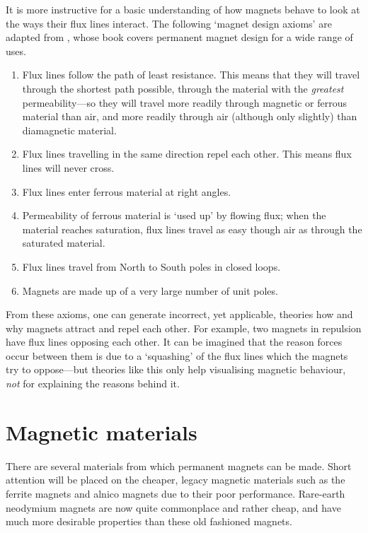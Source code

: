 It is more instructive for a basic understanding of how magnets behave
to look at the ways their flux lines interact. The following `magnet
design axioms' are adapted from \textcite{moskowitz1995}, whose book
covers permanent magnet design for a wide range of uses.

\begin{enumerate}
\item Flux lines follow the path of least resistance. This means that they will
travel through the shortest path possible, 
through the material with the
\emph{greatest} permeability---so they will travel more readily through
magnetic or ferrous material than air, and more readily through air 
(although only slightly) than diamagnetic material.

\item Flux lines travelling in the same direction repel each other. This means
flux lines will never cross.

\item Flux lines enter ferrous material at right angles.

\item Permeability of ferrous material is `used up' by flowing flux; when the
material reaches saturation, flux lines travel as easy though air as through
the saturated material.

\item Flux lines travel from North to South poles in closed loops.

\item Magnets are made up of a very large number of unit poles.
\end{enumerate}

From these axioms, one can generate incorrect, yet applicable,
theories how and why magnets attract and repel each other. For
example, two magnets in repulsion have flux lines opposing each
other. It can be imagined that the reason forces occur between them is
due to a `squashing' of the flux lines which the magnets try to
oppose---but theories like this only help visualising magnetic
behaviour, \emph{not} for explaining the reasons behind it.

\section{Magnetic materials}

There are several materials from which permanent magnets can be
made. Short attention will be placed on the cheaper, legacy magnetic
materials such as the ferrite magnets and alnico magnets due to their
poor performance. Rare-earth neodymium magnets are now quite
commonplace and rather cheap, and have much more desirable properties
than these old fashioned magnets.

